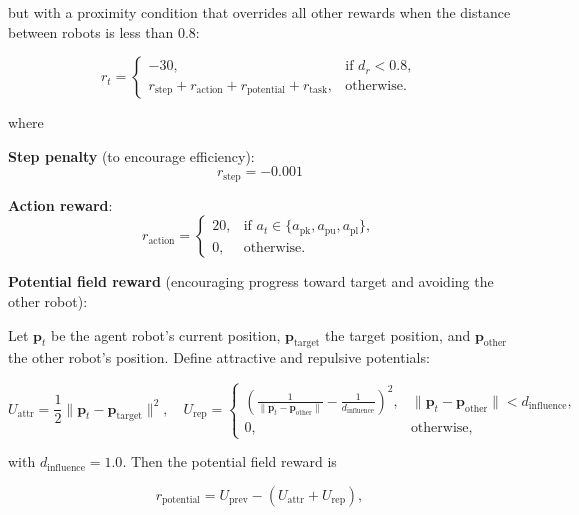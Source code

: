 \documentclass[english, 12pt, a4paper, elec, utf8, a-2b, online]{aaltothesis}
\begin{document}
but with a proximity condition that overrides all other rewards when the distance between robots is less than 0.8:

\begin{equation}
r_t =
\begin{cases}
-30, & \text{if } d_{r} < 0.8, \\
r_{\text{step}} + r_{\text{action}} + r_{\text{potential}} + r_{\text{task}}, & \text{otherwise}.
\end{cases}
\end{equation}

where

\textbf{Step penalty} (to encourage efficiency):
\begin{equation}
r_{\text{step}} = -0.001
\end{equation}

\textbf{Action reward}:
\begin{equation}
r_{\text{action}} =
\begin{cases}
20, & \text{if } a_t \in \{a_{\text{pk}}, a_{\text{pu}}, a_{\text{pl}}\}, \\
0, & \text{otherwise}.
\end{cases}
\end{equation}

\textbf{Potential field reward} (encouraging progress toward target and avoiding the other robot):  

Let $\mathbf{p}_t$ be the agent robot's current position, $\mathbf{p}_{\text{target}}$ the target position, and $\mathbf{p}_{\text{other}}$ the other robot's position. Define attractive and repulsive potentials:

\begin{equation}
U_{\text{attr}} = \frac{1}{2} \|\mathbf{p}_t - \mathbf{p}_{\text{target}}\|^2, 
\quad 
U_{\text{rep}} =
\begin{cases}
\left(\frac{1}{\|\mathbf{p}_t - \mathbf{p}_{\text{other}}\|} - \frac{1}{d_{\text{influence}}}\right)^2, & \|\mathbf{p}_t - \mathbf{p}_{\text{other}}\| < d_{\text{influence}}, \\
0, & \text{otherwise},
\end{cases}
\end{equation}

with $d_{\text{influence}} = 1.0$. Then the potential field reward is

\begin{equation}
r_{\text{potential}} = U_{\text{prev}} - (U_{\text{attr}} + U_{\text{rep}}),
\end{equation}
\end{document}
